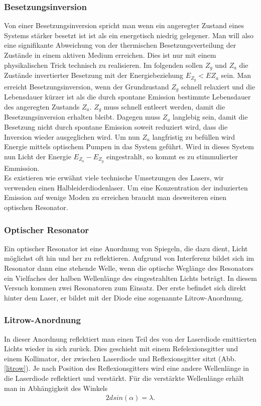 \documentclass[12pt]{article}
\begin{document}
\subsubsection{Besetzungsinversion}
Von einer Besetzungsinversion spricht man wenn ein angeregter Zustand eines Systems stärker besetzt ist ist als ein energetisch niedrig gelegener. Man will also eine signifikante Abweichung von der thermischen Besetzungsverteilung der Zustände in einem aktiven Medium erreichen. Dies ist nur mit einem physikalischen Trick technisch zu realisieren.
Im folgenden sollen $Z_g$ und $Z_a$ die Zustände invertierter Besetzung mit der Energiebeziehung $E_{Z_g}<E{Z_a}$ sein.
Man erreicht Besetzungsinversion, wenn der Grundzustand $Z_g$ schnell relaxiert und die Lebensdauer kürzer ist als die durch spontane Emission bestimmte Lebensdauer des angeregten  Zustands $Z_a$. $Z_g$ muss schnell entleert werden, damit die Besetzungsinversion erhalten bleibt. Dagegen muss $Z_a$ langlebig sein, damit die Besetzung nicht durch spontane Emission soweit reduziert wird, dass die Inversion wieder ausgeglichen wird. Um nun $Z_a$ langfristig zu befüllen wird Energie mittels optischem Pumpen in das System geführt. Wird in dieses System nun Licht der Energie $E_{Z_a}-E_{Z_g}$ eingestrahlt, so kommt es zu stimmulierter Emmission.\\
Es existieren wie erwähnt viele technische Umsetzungen des Lasers, wir verwenden einen Halbleiderdiodenlaser.
Um eine Konzentration der induzierten Emission auf wenige Moden zu erreichen braucht man desweiteren einen optischen Resonator.

\subsubsection{Optischer Resonator}

Ein optischer Resonator ist eine Anordnung von Spiegeln, die dazu dient, Licht möglichst oft hin und her zu reflektieren. Aufgrund von Interferenz bildet sich im Resonator dann eine stehende Welle, wenn die optische Weglänge des Resonators ein Vielfaches der halben Wellenlänge des eingestrahlten Lichts beträgt. In diesem Versuch kommen zwei Resonatoren zum Einsatz. Der erste befindet sich direkt hinter dem Laser, er bildet mit der Diode eine sogenannte Litrow-Anordnung.
\subsubsection{Litrow-Anordnung}
In dieser Anordnung reflektiert man einen Teil des von der Laserdiode emittierten Lichts wieder in sich zurück. Dies geschieht mit einem Refelexionsgitter und einem Kollimator, der zwischen Laserdiode und Reflexionsgitter sitzt (Abb. \ref{litrow}). Je nach Position des Reflexionsgitters wird eine andere Wellenlänge in die Laserdiode reflektiert und verstärkt. Für die verstärkte Wellenlänge erhält man in Abhängigkeit des Winkels
\begin{align}
\label{litrowpeak}
 2d sin(\alpha) = \lambda.
\end{align}
\end{document}
